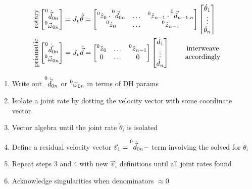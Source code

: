 \documentclass[twocolumn, 12pt]{article}    %
\begin{document}
\begin{align*}
    \text{\rotatebox{90}{\hspace{-10pt}rotary}}&
    \begin{bmatrix}
        \prescript{0}{}{\dot{\vec{d}}}_{0n} \\ \prescript{0}{}{\vec{\omega}}_{0n} 
    \end{bmatrix} = J_v \dot{\vec{\theta}}=\begin{bmatrix}
        \prescript{0}{}{\hat{z}}_0 \cdot \prescript{0}{}{\vec{d}}_{0n} & \dots & \prescript{0}{}{\hat{z}}_{n-1} \cdot \prescript{0}{}{\vec{d}}_{n-1,n}\\
        \prescript{0}{}{\hat{z}}_0 & \dots & \prescript{0}{}{\hat{z}}_{n-1}
    \end{bmatrix} \begin{bmatrix}
        \dot{\theta}_1 \\ \vdots \\ \dot{\theta}_n
    \end{bmatrix}\\
    \text{\rotatebox{90}{\hspace{-17.5pt}prismatic}} &
    \begin{bmatrix}
        \prescript{0}{}{\dot{\vec{d}}}_{0n} \\ \prescript{0}{}{\vec{\omega}}_{0n} 
    \end{bmatrix} = J_v \dot{\vec{d}}= \begin{bmatrix}
        \prescript{0}{}{\hat{z}}_0  & \dots & \prescript{0}{}{\hat{z}}_{n-1} \\
        0 & \dots & 0
    \end{bmatrix} \begin{bmatrix}
        \dot{d}_1 \\ \vdots \\ \dot{d}_n
    \end{bmatrix} \hspace{22pt} \begin{matrix}
        \text{interweave}\\ \text{accordingly}
    \end{matrix}
\end{align*}
\vspace{-20pt}
\begin{enumerate}
    \item Write out \(\prescript{0}{}{\dot{\vec{d}}}_{0n}\) or \(\prescript{0}{}{\vec{\omega}}_{0n}\) in terms of DH params 
    \item Isolate a joint rate by dotting the velocity vector with some coordinate vector. 
    \item Vector algebra until the joint rate \(\dot{\theta}_i\) is isolated \vspace{-5pt}
    \item Define a residual velocity vector \(\vec{v}_1 = \prescript{0}{}{\dot{\vec{d}}}_{0n} - \) term involving the solved for \(\dot{\theta}_i\)
    \item Repeat steps 3 and 4 with new \(\vec{v}_i\) definitions until all joint rates found
    \item Acknowledge singularities when denominators \(\approx 0\)
\end{enumerate}
\end{document}
